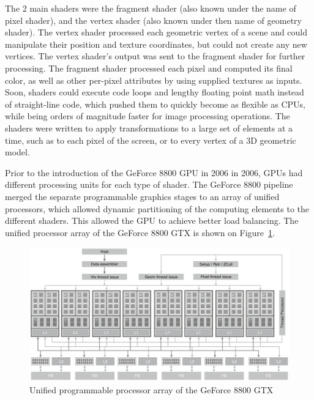 \documentclass[10pt, a4paper]{report}
\begin{document}
The 2 main shaders were the fragment shader (also known under the name of pixel
shader), and the vertex shader (also known under then name of geometry shader).
The vertex shader processed each geometric vertex of a scene and could
manipulate their position and texture coordinates, but could not create any new
vertices.
The vertex shader's output was sent to the fragment shader for further
processing.
The fragment shader processed each pixel and computed its final color, as well
as other per-pixel attributes by using supplied textures as inputs.
Soon, shaders could execute code loops and lengthy floating point math instead
of straight-line code, which pushed them to quickly become as flexible as CPUs,
while being orders of magnitude faster for image processing operations.
The shaders were written to apply transformations to a large set of elements at
a time, such as to each pixel of the screen, or to every vertex of a 3D
geometric model.

Prior to the introduction of the GeForce 8800 GPU in 2006 in 2006, GPUs had
different processing units for each type of shader.
The GeForce 8800 pipeline merged the separate programmable graphics stages to an
array of unified processors, which allowed dynamic partitioning of the computing
elements to the different shaders.
This allowed the GPU to achieve better load balancing.
The unified processor array of the GeForce 8800 GTX is shown on
Figure~\ref{fig:unified_programmable_processor_array_of_the_GeForce_8800_GTX_graphics_pipeline}.

\begin{figure}
\includegraphics[width=\linewidth]{figs/unified_programmable_processor_array_of_the_GeForce_8800_GTX_graphics_pipeline}
\caption{Unified programmable processor array of the GeForce 8800 GTX}
\label{fig:unified_programmable_processor_array_of_the_GeForce_8800_GTX_graphics_pipeline}
\end{figure}
\end{document}
